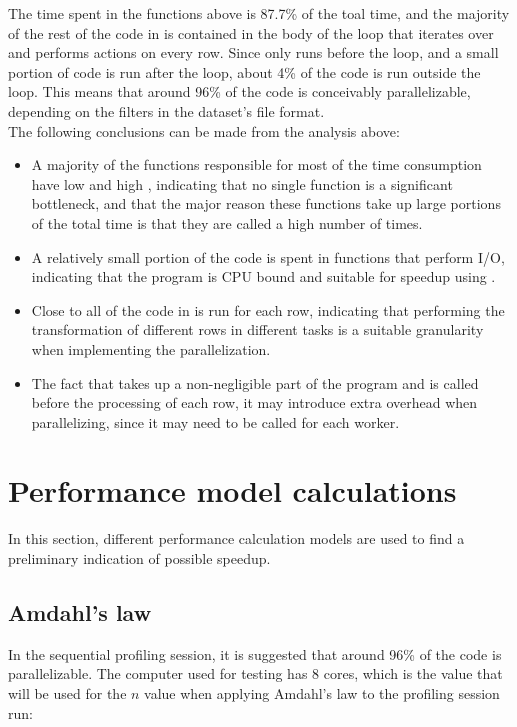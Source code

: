 The time spent in the functions above is 87.7\% of the toal time, and the majority of the rest of the code in  is contained in the body of the loop that iterates
over and performs actions on every row. Since only  runs before the loop, and a small portion of code is run after the loop, about 4\% of the code 
is run outside the loop. This means that around 96\% of the code is conceivably parallelizable, depending on the filters in the dataset's file format.\\

The following conclusions can be made from the analysis above:

\begin{itemize}
  \item A majority of the functions responsible for most of the time consumption have low  and high , indicating that no single function is
    a significant bottleneck, and that the major reason these functions take up large portions of the total time is that they are called a high number of times.
  \item A relatively small portion of the code is spent in functions that perform I/O, indicating that the program is CPU bound and suitable for speedup using
    .
  \item Close to all of the code in  is run for each row, indicating that performing the transformation of different rows in different tasks is a
    suitable granularity when implementing the parallelization.
  \item The fact that  takes up a non-negligible part of the program and is called before the processing of each row, it may introduce extra overhead
    when parallelizing, since it may need to be called for each worker.
\end{itemize}

\section{Performance model calculations} \label{performance_model_calculations}
In this section, different performance calculation models are used to find a preliminary indication of possible speedup.

\subsection{Amdahl's law}
In the sequential profiling session, it is suggested that around 96\% of the code is parallelizable. The computer used for testing has 8 cores,
which is the value that will be used for the $n$ value when applying Amdahl's law to the profiling session run:

